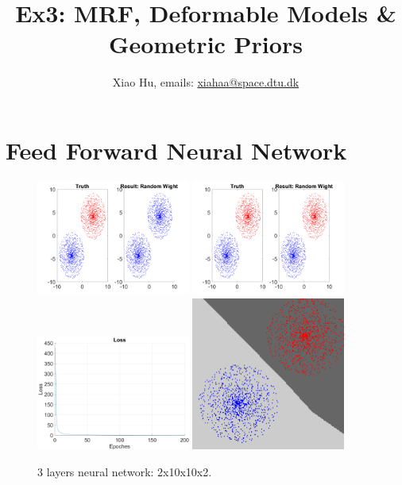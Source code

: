 \documentclass[a4paper]{article}
\title{Ex3: MRF, Deformable Models \& Geometric Priors}
\author{Xiao Hu, emails: \url{xiahaa@space.dtu.dk}}
\begin{document}
	\maketitle
	\thispagestyle{empty}
	\section{Feed Forward Neural Network}
	\begin{figure}[htbp]
	\centering
	\includegraphics[width=0.45\textwidth]{./figures/ex2_1.png}
	\includegraphics[width=0.45\textwidth]{./figures/ex2_2.png}
	\includegraphics[width=0.45\textwidth]{./figures/ex2_3.png}
	\includegraphics[width=0.45\textwidth]{./figures/ex2_4.png}
    \caption{$3$ layers neural network: 2x10x10x2.}
\end{figure}
\end{document}
